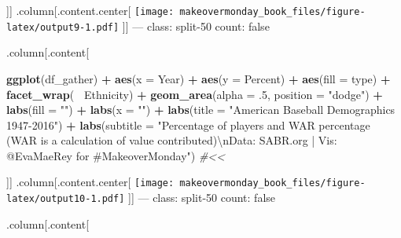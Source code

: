 \documentclass[]{book}
\newenvironment{Shaded}{\begin{snugshade}}{\end{snugshade}}
\newcommand{\KeywordTok}[1]{\textcolor[rgb]{0.13,0.29,0.53}{\textbf{#1}}}
\newcommand{\DataTypeTok}[1]{\textcolor[rgb]{0.13,0.29,0.53}{#1}}
\newcommand{\DecValTok}[1]{\textcolor[rgb]{0.00,0.00,0.81}{#1}}
\newcommand{\CharTok}[1]{\textcolor[rgb]{0.31,0.60,0.02}{#1}}
\newcommand{\StringTok}[1]{\textcolor[rgb]{0.31,0.60,0.02}{#1}}
\newcommand{\CommentTok}[1]{\textcolor[rgb]{0.56,0.35,0.01}{\textit{#1}}}
\newcommand{\OperatorTok}[1]{\textcolor[rgb]{0.81,0.36,0.00}{\textbf{#1}}}
\newcommand{\NormalTok}[1]{#1}
\theoremstyle{definition}
\theoremstyle{definition}
\theoremstyle{definition}
\theoremstyle{remark}
\begin{document}
{]}{]} .column{[}.content.center{[}
\texttt{[image: makeovermonday\_book\_files/figure-latex/output9-1.pdf]}
{]}{]} --- class: split-50 count: false

.column{[}.content{[}

\begin{Shaded}
\begin{Highlighting}[]
\KeywordTok{ggplot}\NormalTok{(df_gather) }\OperatorTok{+}
\StringTok{  }\KeywordTok{aes}\NormalTok{(}\DataTypeTok{x =}\NormalTok{ Year) }\OperatorTok{+}
\StringTok{  }\KeywordTok{aes}\NormalTok{(}\DataTypeTok{y =}\NormalTok{ Percent) }\OperatorTok{+}
\StringTok{  }\KeywordTok{aes}\NormalTok{(}\DataTypeTok{fill =}\NormalTok{ type) }\OperatorTok{+}
\StringTok{  }\KeywordTok{facet_wrap}\NormalTok{(}\OperatorTok{~}\StringTok{ }\NormalTok{Ethnicity) }\OperatorTok{+}
\StringTok{  }\KeywordTok{geom_area}\NormalTok{(}\DataTypeTok{alpha =}\NormalTok{ .}\DecValTok{5}\NormalTok{, }\DataTypeTok{position =} \StringTok{"dodge"}\NormalTok{) }\OperatorTok{+}
\StringTok{  }\KeywordTok{labs}\NormalTok{(}\DataTypeTok{fill =} \StringTok{""}\NormalTok{) }\OperatorTok{+}
\StringTok{  }\KeywordTok{labs}\NormalTok{(}\DataTypeTok{x =} \StringTok{""}\NormalTok{) }\OperatorTok{+}
\StringTok{  }\KeywordTok{labs}\NormalTok{(}\DataTypeTok{title =} \StringTok{"American Baseball Demographics 1947-2016"}\NormalTok{) }\OperatorTok{+}
\StringTok{  }\KeywordTok{labs}\NormalTok{(}\DataTypeTok{subtitle =} \StringTok{"Percentage of players and WAR percentage (WAR is a calculation of value contributed)}\CharTok{\textbackslash{}n}\StringTok{Data: SABR.org | Vis: @EvaMaeRey for #MakeoverMonday"}\NormalTok{)  }\CommentTok{#<<}
\end{Highlighting}
\end{Shaded}

{]}{]} .column{[}.content.center{[}
\texttt{[image: makeovermonday\_book\_files/figure-latex/output10-1.pdf]}
{]}{]} --- class: split-50 count: false

.column{[}.content{[}
\end{document}
